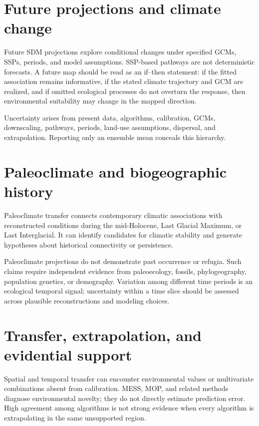 \section{Future projections and climate change}

Future SDM projections explore conditional changes under specified GCMs, SSPs, periods, and model assumptions. SSP-based pathways are not deterministic forecasts. A future map should be read as an if--then statement: if the fitted association remains informative, if the stated climate trajectory and GCM are realized, and if omitted ecological processes do not overturn the response, then environmental suitability may change in the mapped direction.

Uncertainty arises from present data, algorithms, calibration, GCMs, downscaling, pathways, periods, land-use assumptions, dispersal, and extrapolation. Reporting only an ensemble mean conceals this hierarchy.

\section{Paleoclimate and biogeographic history}

Paleoclimate transfer connects contemporary climatic associations with reconstructed conditions during the mid-Holocene, Last Glacial Maximum, or Last Interglacial. It can identify candidates for climatic stability and generate hypotheses about historical connectivity or persistence.

Paleoclimate projections do not demonstrate past occurrence or refugia. Such claims require independent evidence from paleoecology, fossils, phylogeography, population genetics, or demography. Variation among different time periods is an ecological temporal signal; uncertainty within a time slice should be assessed across plausible reconstructions and modeling choices.

\section{Transfer, extrapolation, and evidential support}

Spatial and temporal transfer can encounter environmental values or multivariate combinations absent from calibration. MESS, MOP, and related methods diagnose environmental novelty; they do not directly estimate prediction error. High agreement among algorithms is not strong evidence when every algorithm is extrapolating in the same unsupported region.

